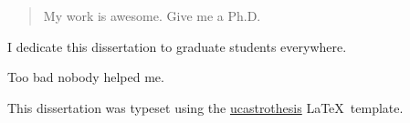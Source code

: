 \documentclass[12pt]{myucthesis}
\begin{document}
\ssp %
\hypersetup{pageanchor=false}

\maketitle
\copyrightpage

\begin{abstract}
My work is awesome. Give me a Ph.D.
\end{abstract}

\hypersetup{pageanchor=true}
\begin{frontmatter}

\begin{dedication}
\null\vfil
{\large
\begin{center}
I dedicate this dissertation to graduate students everywhere.
\end{center}}
\null\vfil
\end{dedication}

\tableofcontents
\listoffigures %
\listoftables %


\begin{acknowledgements}
Too bad nobody helped me.

This dissertation was typeset using the
\href{https://github.com/pkgw/ucastrothesis}{\textsf{ucastrothesis}}
\LaTeX\ template.

\end{acknowledgements}
\end{frontmatter}





{}
\end{document}
